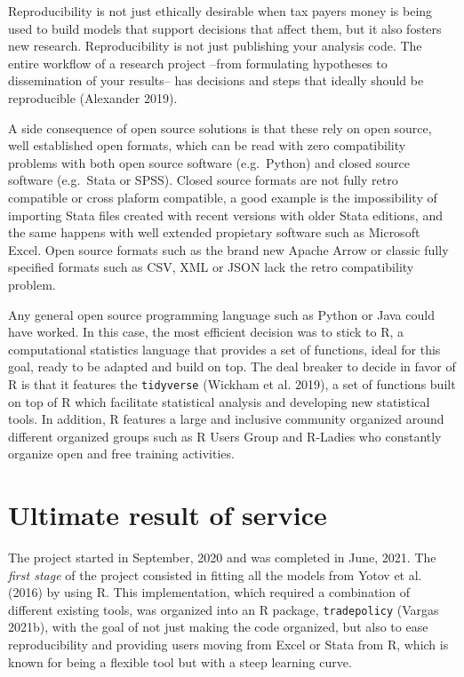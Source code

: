 \documentclass[12pt,reqno,oneside,pdftex]{formato-puc/puctesis} %
\begin{document}
Reproducibility is not just ethically desirable when tax payers money is
being used to build models that support decisions that affect them, but
it also fosters new research. Reproducibility is not just publishing
your analysis code. The entire workflow of a research project --from
formulating hypotheses to dissemination of your results-- has decisions
and steps that ideally should be reproducible (Alexander 2019).

A side consequence of open source solutions is that these rely on open
source, well established open formats, which can be read with zero
compatibility problems with both open source software (e.g.~Python) and
closed source software (e.g.~Stata or SPSS). Closed source formats are
not fully retro compatible or cross plaform compatible, a good example
is the impossibility of importing Stata files created with recent
versions with older Stata editions, and the same happens with well
extended propietary software such as Microsoft Excel. Open source
formats such as the brand new Apache Arrow or classic fully specified
formats such as CSV, XML or JSON lack the retro compatibility problem.

Any general open source programming language such as Python or Java
could have worked. In this case, the most efficient decision was to
stick to R, a computational statistics language that provides a set of
functions, ideal for this goal, ready to be adapted and build on top.
The deal breaker to decide in favor of R is that it features the
\texttt{tidyverse} (Wickham et al. 2019), a set of functions built on
top of R which facilitate statistical analysis and developing new
statistical tools. In addition, R features a large and inclusive
community organized around different organized groups such as R Users
Group and R-Ladies who constantly organize open and free training
activities.

\hypertarget{ultimate-result-of-service}{%
\section{Ultimate result of service}\label{ultimate-result-of-service}}

The project started in September, 2020 and was completed in June, 2021.
The \emph{first stage} of the project consisted in fitting all the
models from Yotov et al. (2016) by using R. This implementation, which
required a combination of different existing tools, was organized into
an R package, \texttt{tradepolicy} (Vargas 2021b), with the goal of not
just making the code organized, but also to ease reproducibility and
providing users moving from Excel or Stata from R, which is known for
being a flexible tool but with a steep learning curve.
\end{document}
